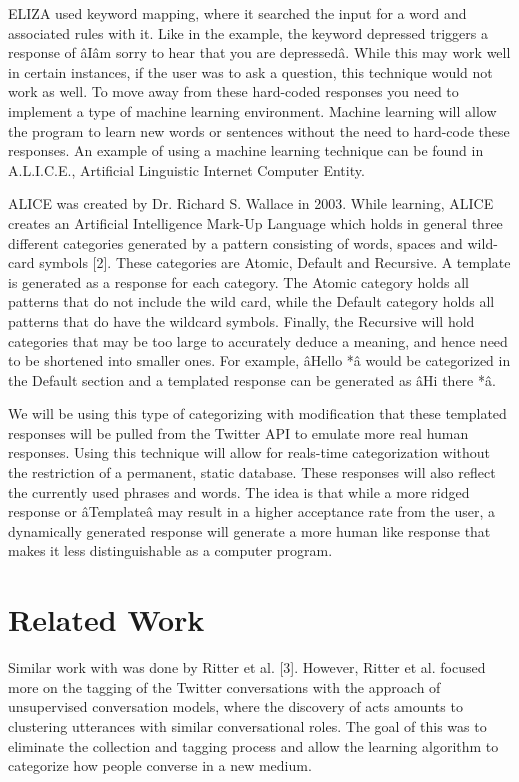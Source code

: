\documentclass[letterpaper]{article} %
\begin{document}
ELIZA used keyword mapping, where it searched the input for a word and associated rules with it. Like in the example, the keyword depressed triggers a response of âIâm sorry to hear that you are depressedâ. While this may work well in certain instances, if the user was to ask a question, this technique would not work as well. To move away from these hard-coded responses you need to implement a type of machine learning environment. Machine learning will allow the program to learn new words or sentences without the need to hard-code these responses. An example of using a machine learning technique can be found in A.L.I.C.E., Artificial Linguistic Internet Computer Entity.

ALICE was created by Dr. Richard S. Wallace in 2003. While learning, ALICE creates an Artificial Intelligence Mark-Up Language which holds in general three different categories generated by a pattern consisting of words, spaces and wild-card symbols [2]. These categories are Atomic, Default and Recursive. A template is generated as a response for each category. The Atomic category holds all patterns that do not include the wild card, while the Default category holds all patterns that do have the wildcard symbols. Finally, the Recursive will hold categories that may be too large to accurately deduce a meaning, and hence need to be shortened into smaller ones. For example, âHello *â would be categorized in the Default section and a templated response can be generated as âHi there *â.

We will be using this type of categorizing with modification that these templated responses will be pulled from the Twitter API to emulate more real human responses. Using this technique will allow for reals-time categorization without the restriction of a permanent, static database. These responses will also reflect the currently used phrases and words. The idea is that while a more ridged response or âTemplateâ may result in a higher acceptance rate from the user, a dynamically generated response will generate a more human like response that makes it less distinguishable as a computer program.

\section{Related Work}
Similar work with was done by Ritter et al. [3]. However, Ritter et al. focused more on the tagging of the Twitter conversations with the approach of unsupervised conversation models, where the discovery of acts amounts to clustering utterances with similar conversational roles. The goal of this was to eliminate the collection and tagging process and allow the learning algorithm to categorize how people converse in a new medium.
\end{document}
